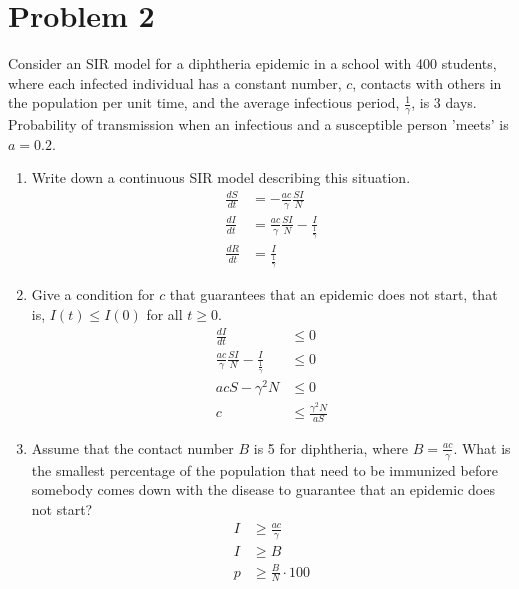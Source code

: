 \documentclass{article}
\begin{document}
\section*{Problem 2} Consider an SIR model for a diphtheria epidemic in a school with 400 students, where each infected individual has a constant number, $c$, contacts with others in the population per unit time, and the average infectious period, $\frac{1}{\gamma}$, is 3 days. Probability of transmission when an infectious and a susceptible person 'meets' is $a=0.2$.
\begin{enumerate}[label=(\alph*)]
    \item Write down a continuous SIR model describing this situation.\begin{align*}
\frac{dS}{dt} &= -\frac{a c}{\gamma} \frac{SI}{N} \\
\frac{dI}{dt} &= \frac{a c}{\gamma} \frac{SI}{N} - \frac{I}{\frac{1}{\gamma}} \\
\frac{dR}{dt} &= \frac{I}{\frac{1}{\gamma}}
\end{align*}
    \item Give a condition for $c$ that guarantees that an epidemic does not start, that is, $I(t) \leq I(0)$ for all $t \geq 0$.\begin{align*}
\frac{dI}{dt} &\leq 0 \\
\frac{a c}{\gamma} \frac{SI}{N} - \frac{I}{\frac{1}{\gamma}} &\leq 0 \\
a c S - \gamma^2N &\leq 0 \\
c &\leq \frac{\gamma^2N}{aS}
\end{align*}
    \item Assume that the contact number $B$ is 5 for diphtheria, where $B=\frac{a c}{\gamma}$. What is the smallest percentage of the population that need to be immunized before somebody comes down with the disease to guarantee that an epidemic does not start?\begin{align*}
        I &\geq \frac{a c}{\gamma} \\
I &\geq B \\
p &\geq \frac{B}{N} \cdot 100
    \end{align*}
\end{enumerate}
\end{document}
